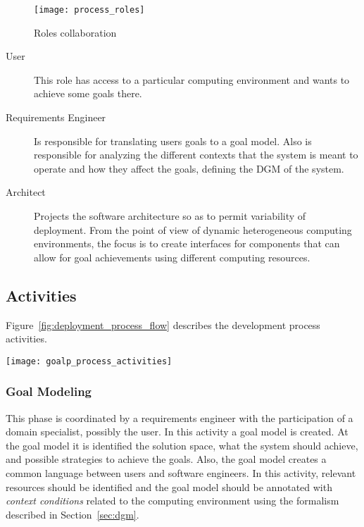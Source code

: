  \begin{figure}[!htb]
   \centering
   \texttt{[image: process\_roles]}
   \caption{Roles collaboration}
 \label{fig:process_roles}
 \end{figure}

\begin{description}
  \item[User]
  This role has access to a particular computing environment and wants to achieve some goals there.
  \item[Requirements Engineer]
  Is responsible for translating users goals to a goal model. Also is responsible for analyzing the different contexts that the system is meant to operate and how they affect the goals, defining the DGM of the system.
  \item[Architect]
  Projects the software architecture so as to permit variability of deployment.
  From the point of view of dynamic heterogeneous computing environments, the focus is to create interfaces for components that can allow for goal achievements using different computing resources.

\end{description}



\subsection{Activities}

Figure~\ref{fig:deployment_process_flow} describes the development process activities.

\label{sub:Proposal}
\begin{figure*}[!htb]
  \centering
  \texttt{[image: goalp\_process\_activities]}
  \caption{Deployment Process Activities}
\label{fig:deployment_process_flow}
\end{figure*}

\subsubsection{Goal Modeling}
This phase is coordinated by a requirements engineer with the participation of a domain specialist, possibly the user.
In this activity a goal model is created. At the goal model it is identified the solution space, what the system should achieve, and possible strategies to achieve the goals. Also, the goal model creates a common language between users and software engineers.
In this activity, relevant resources should be identified and the goal model should be annotated with \emph{context conditions} related to the computing environment using the formalism described in Section~\ref{sec:dgm}.

